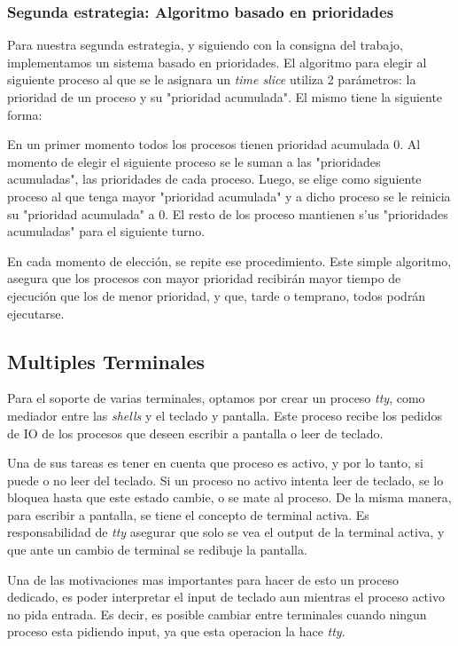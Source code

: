 \documentclass[a4paper,10pt]{article}
\begin{document}
        \subsubsection{Segunda estrategia: Algoritmo basado en prioridades}
        Para nuestra segunda estrategia, y siguiendo con la consigna del trabajo, implementamos un sistema basado en 
        prioridades. El algoritmo para elegir al siguiente proceso al que se le asignara un \textit{time slice} utiliza
        2 parámetros: la prioridad de un proceso y su "prioridad acumulada". El mismo tiene la siguiente forma:

        En un primer momento todos los procesos tienen prioridad acumulada 0. Al momento de elegir el siguiente proceso
        se le suman a las "prioridades acumuladas", las prioridades de cada proceso. Luego, se elige como siguiente 
        proceso al que tenga mayor "prioridad acumulada" y a dicho proceso se le reinicia su "prioridad acumulada" a 0.
        El resto de los proceso mantienen s'us "prioridades acumuladas" para el siguiente turno. 

        En cada momento de elección, se repite ese procedimiento. Este simple algoritmo, asegura que los procesos con 
        mayor prioridad recibirán mayor tiempo de ejecución que los de menor prioridad, y que, tarde o temprano, todos
        podrán ejecutarse.

\subsection{Multiples Terminales}
Para el soporte de varias terminales, optamos por crear un proceso \textit{tty}, como mediador entre las \textit{shells} y el teclado y pantalla.
Este proceso recibe los pedidos de IO de los procesos que deseen escribir a pantalla o leer de teclado.

Una de sus tareas es tener en cuenta que proceso es activo, y por lo tanto, si puede o no leer del teclado.
Si un proceso no activo intenta leer de teclado, se lo bloquea hasta que este estado cambie, o se mate al proceso.
De la misma manera, para escribir a pantalla, se tiene el concepto de terminal activa.
Es responsabilidad de \textit{tty} asegurar que solo se vea el output de la terminal activa, y que ante un cambio de terminal se redibuje la pantalla.

Una de las motivaciones mas importantes para hacer de esto un proceso dedicado, es poder interpretar el input de teclado aun mientras el proceso activo no pida entrada.
Es decir, es posible cambiar entre terminales cuando ningun proceso esta pidiendo input, ya que esta operacion la hace \textit{tty}.
\end{document}
